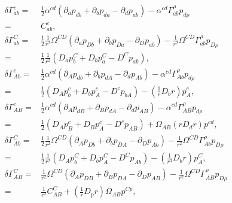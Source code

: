 \documentclass[12pt]{report}
\begin{document}
\begin{align}
    \delta\Gamma^c_{ab}
    =&
    \frac{1}{2}\alpha^{cd}
    \left(
        \partial_ap_{db}
        +
        \partial_bp_{da}
        -
        \partial_dp_{ab}
    \right)
    -
    \alpha^{cd}\Gamma^{\rho}_{ab}p_{d\rho}
    \nonumber\\
    =&
    C^c_{ab}
    ,\\
    \delta\Gamma^C_{ab}
    =&
    \frac{1}{2}\frac{1}{r^2}\Omega^{CD}
    \left(
        \partial_ap_{Db}
        +
        \partial_bp_{Da}
        -
        \partial_Dp_{ab}
    \right)
    -
    \frac{1}{r^2}\Omega^{CD}\Gamma^{\rho}_{ab}p_{D\rho}
    \nonumber\\
    =&
    \frac{1}{2}\frac{1}{r^2}
    \left(
        D_ap^C_b
        +
        D_bp^C_a
        -
        D^Cp_{ab}
    \right)
    ,\\
    \delta\Gamma^c_{Ab}
    =&
    \frac{1}{2}\alpha^{cd}
    \left(
        \partial_Ap_{db}
        +
        \partial_bp_{dA}
        -
        \partial_dp_{Ab}
    \right)
    -
    \alpha^{cd}\Gamma^{\rho}_{Ab}p_{d\rho}
    \nonumber \\
    =&
    \frac{1}{2}
    \left(
        D_Ap^c_b
        +
        D_bp^c_A
        -
        D^cp_{bA}
    \right)
    -
    \left(\frac{1}{r}D_br\right) p^c_A
    ,\\
    \delta\Gamma^c_{AB}
    =&
    \frac{1}{2}\alpha^{cd}
    \left(
        \partial_Ap_{dB}
        +
        \partial_Bp_{dA}
        -
        \partial_dp_{AB}
    \right)
    -
    \alpha^{cd}\Gamma^{\rho}_{AB}p_{d\rho}
    \nonumber\\
    =&
    \frac{1}{2}
    \left(
        D_Ap^c_B
        +
        D_Bp^c_A
        -
        D^cp_{AB}
    \right)
    +
    \Omega_{AB}\left(rD_dr\right)p^{cd}
    ,\\
    \delta\Gamma^C_{Ab}
    =&
    \frac{1}{2}\frac{1}{r^2}\Omega^{CD}
    \left(
        \partial_Ap_{Db}
        +
        \partial_bp_{DA}
        -
        \partial_Dp_{Ab}
    \right)
    -
    \frac{1}{r^2}\Omega^{CD}\Gamma^{\rho}_{Ab}p_{D\rho}
    \nonumber\\
    =&
    \frac{1}{2}\frac{1}{r^2}
    \left(
        D_Ap^C_b
        +
        D_bp^C_A
        -
        D^Cp_{Ab}
    \right)
    -
    \left(\frac{1}{r^3}D_br\right)p^C_A
    ,\\
    \delta\Gamma^C_{AB}
    =&
    \frac{1}{r^2}\Omega^{CD}
    \left(
        \partial_Ap_{DB}
        +
        \partial_Bp_{DA}
        -
        \partial_Dp_{AB}
    \right)
    -
    \frac{1}{r^2}\Omega^{CD}\Gamma^{\rho}_{AB}p_{D\rho}
    \nonumber\\
    =&
    \frac{1}{r^2}C^C_{AB}
    +
    \left(\frac{1}{r}D_pr\right)\Omega_{AB}p^{Cp}
    ,
\end{align}
\end{document}
